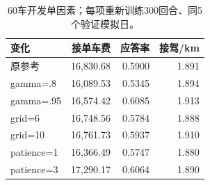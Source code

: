 \begin{table}[htbp]\centering\small
\caption{60车开发单因素；每项重新训练300回合、同5个验证模拟日。}\label{tab:rlsensitivity}
\begin{tabularx}{\linewidth}{Yrrr}\toprule
变化 & 接单车费 & 应答率 & 接驾/km\\\midrule
原参考 & 16,830.68 & 0.5900 & 1.891\\
gamma=.8 & 16,089.53 & 0.5345 & 1.894\\
gamma=.95 & 16,574.42 & 0.6085 & 1.913\\
grid=6 & 16,748.56 & 0.5784 & 1.888\\
grid=10 & 16,761.73 & 0.5937 & 1.910\\
patience=1 & 16,366.49 & 0.5747 & 1.880\\
patience=3 & 17,290.17 & 0.6064 & 1.890\\
\bottomrule\end{tabularx}
\end{table}
